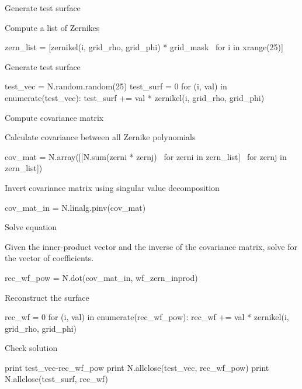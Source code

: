 \documentclass[xetex,10pt]{beamer}
\def\spacer{\vspace*{1em}}
\begin{document}
\begin{frame}[fragile]{Generate test surface}

Compute a list of Zernikes

\begin{python}
zern_list = [zernikel(i, grid_rho, grid_phi) * grid_mask \
  for i in xrange(25)]
\end{python}

\spacer
\pause
Generate test surface

\begin{python}
test_vec = N.random.random(25)
test_surf = 0
for (i, val) in enumerate(test_vec):
  test_surf += val * zernikel(i, grid_rho, grid_phi)
\end{python}
\end{frame}

\begin{frame}[fragile]{Compute covariance matrix}

Calculate covariance between all Zernike polynomials

\begin{python}
cov_mat = N.array([[N.sum(zerni * zernj) \
  for zerni in zern_list] \
    for zernj in zern_list])
\end{python}

\spacer
\pause
Invert covariance matrix using singular value decomposition
\begin{python}
cov_mat_in = N.linalg.pinv(cov_mat)
\end{python}

\end{frame}

\begin{frame}[fragile]{Solve equation}

Given the inner-product vector and the inverse of the covariance matrix, solve for the vector of coefficients.

\begin{python}
rec_wf_pow = N.dot(cov_mat_in, wf_zern_inprod)
\end{python}

\spacer
\pause
Reconstruct the surface
\begin{python}
rec_wf = 0
for (i, val) in enumerate(rec_wf_pow):
  rec_wf += val * zernikel(i, grid_rho, grid_phi)
\end{python}

\spacer
\pause
Check solution
\begin{python}
print test_vec-rec_wf_pow
print N.allclose(test_vec, rec_wf_pow)
print N.allclose(test_surf, rec_wf)
\end{python}

\end{frame}
\end{document}
